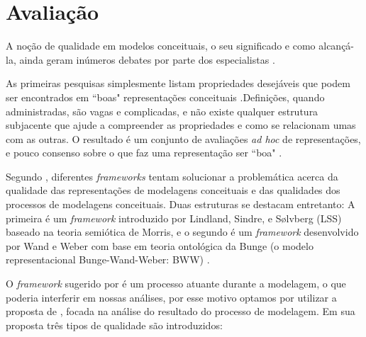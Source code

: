 

\chapter{\hspace*{3pt} Avaliação}
\label{chap:avaliacao}


A noção de qualidade em modelos conceituais, o seu significado e como alcançá-la, ainda geram inúmeros debates por parte dos especialistas \citep{teeuw:1997.quality}. 

As primeiras pesquisas simplesmente listam propriedades desejáveis que podem ser encontrados em ``boas" representações conceituais \citep{navathe:1992.conceptual}.Definições, quando administradas, são vagas e complicadas, e não existe qualquer estrutura subjacente que ajude a compreender as propriedades e como se relacionam umas com as outras. O resultado é um conjunto de avaliações \textit{ad hoc} de representações, e pouco consenso sobre o que faz uma representação ser ``boa" \citep{moody:1998.improving}. 

Segundo \citet{nelson:2012.conceptual}, diferentes \textit{frameworks} tentam solucionar a problemática acerca da qualidade das representações de modelagens conceituais e das qualidades dos processos de modelagens conceituais. Duas estruturas se destacam entretanto: A primeira é um \textit{framework} introduzido por Lindland, Sindre, e Sølvberg (LSS) \citep{lindland:1994.understanding} baseado na teoria semiótica de Morris, e o segundo é um \textit{framework} desenvolvido por Wand e Weber com base em teoria ontológica da Bunge (o modelo representacional Bunge-Wand-Weber: BWW) \citep{wand:1990.ontological}. 

O \textit{framework} sugerido por \citet{wand:1990.ontological} é um processo atuante durante a modelagem, o que poderia interferir em nossas análises, por esse motivo optamos por utilizar a proposta de \citet{lindland:1994.understanding}, focada na análise do resultado do processo de modelagem. Em sua proposta três tipos de qualidade são introduzidos:
 
